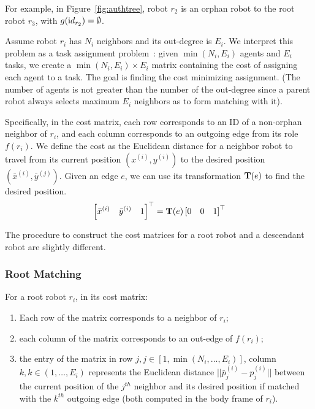 For example, in Figure~\ref{fig:authtree}, robot $r_2$ is an orphan robot to the root robot $r_3$, with $g({\textrm id}_{r_2}) = \emptyset$.

Assume robot $r_i$ has $N_i$ neighbors and its out-degree is $E_i$. 
%
We interpret this problem as a task assignment problem~\cite{Kuh55, Mun57}: given $\min(N_i, E_i)$ agents and $E_i$ tasks, we create a $\min(N_i, E_i)\times E_i$ matrix containing the cost of assigning each agent to a task. 
%
The goal is finding the cost minimizing assignment. 
%
(The number of agents is not greater than the number of
the out-degree since a parent robot always selects maximum $E_i$ neighbors as to form matching with it).

Specifically, in the cost matrix, each row corresponds to an ID of a non-orphan neighbor of $r_i$, and each column corresponds to an outgoing edge from its role $f(r_i)$. 
%
We define the cost as the Euclidean distance for a neighbor robot to
travel from its current position $(x^{(i)}, y^{(i)})$ to the desired
position $(\bar{x}^{(i)}, \bar{y}^{(j)})$. 
%
Given an edge $e$, we can use its transformation $\mathbf{T}(e)$ to find the desired position.
\begin{equation}
  \label{eq:trans-pos}
  \left[\bar{x}^{(i)} \quad \bar{y}^{(i)} \quad 1\right]^\top = \mathbf{T}(e) \left[0 \quad 0 \quad 1\right]^\top
\end{equation}

The procedure to construct the cost matrices for a root robot and a descendant robot are slightly different.

\subsubsection{Root Matching}

For a root robot $r_i$, in its cost matrix:
\begin{enumerate}
  \item Each row of the matrix corresponds to a neighbor of $r_i$;
  \item each column of the matrix corresponds to an out-edge of $f(r_i)$;
  \item the entry of the matrix in row $j, j \in [1, \min(N_i,\ldots, E_i)]$, column
    $k, k \in (1,\ldots, E_i)$ represents the Euclidean distance $|| \bar{p}_j^{(i)} -
    {p}_j^{(i)} ||$ between the current position of the $j^{th}$ neighbor and
    its desired position if matched with the $k^{th}$ outgoing edge (both computed in the body frame of $r_i$).  
\end{enumerate}

